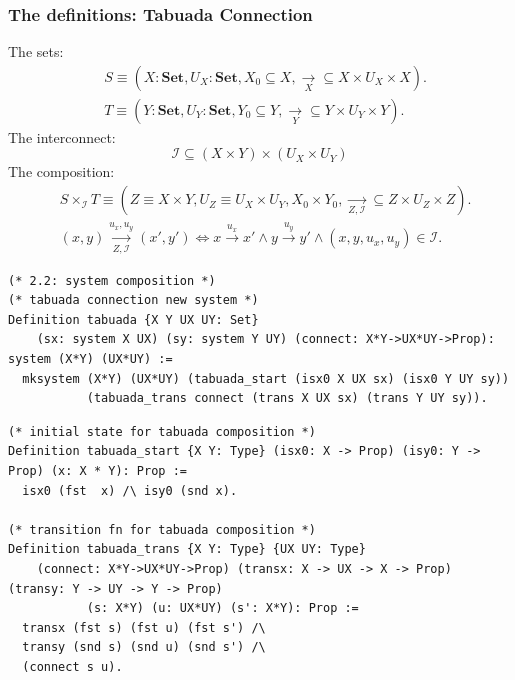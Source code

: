 \documentclass{beamer}
\begin{document}
\begin{frame}[fragile]
\frametitle{The definitions: Tabuada Connection}

{\tiny
The sets: 
\begin{align*}
    &S \equiv (X: \textbf{Set}, U_X: \textbf{Set}, X_0 \subseteq X, \underset{X}{\rightarrow} \subseteq X \times U_X \times X). \\
    &T \equiv (Y: \textbf{Set}, U_Y: \textbf{Set}, Y_0 \subseteq Y, \underset{Y}{\rightarrow} \subseteq Y \times U_Y \times Y).
\end{align*} }
\pause
{\tiny The interconnect: $$\mathcal I \subseteq (X \times Y) \times (U_X \times U_Y)$$ }
\pause
{\tiny
The composition: 
\begin{align*}
    &S \times_{\mathcal I} T \equiv 
     (Z \equiv X \times Y, U_Z \equiv U_X \times U_Y,  X_0 \times Y_0, \underset{Z, \mathcal{I}}{\rightarrow} \subseteq Z \times U_Z \times Z). \\
    &(x, y) \underset{Z, \mathcal I}{\xrightarrow{u_x,u_y}} (x', y') \iff 
      x \xrightarrow{u_x} x' \land 
      y \xrightarrow{u_y} y' \land (x, y, u_x, u_y) \in \mathcal I.
\end{align*}
}

\pause

{\tiny
\begin{verbatim}
(* 2.2: system composition *)
(* tabuada connection new system *)
Definition tabuada {X Y UX UY: Set} 
    (sx: system X UX) (sy: system Y UY) (connect: X*Y->UX*UY->Prop): system (X*Y) (UX*UY) :=
  mksystem (X*Y) (UX*UY) (tabuada_start (isx0 X UX sx) (isx0 Y UY sy))
           (tabuada_trans connect (trans X UX sx) (trans Y UY sy)).
\end{verbatim}
}


{\tiny
\begin{verbatim}
(* initial state for tabuada composition *)
Definition tabuada_start {X Y: Type} (isx0: X -> Prop) (isy0: Y -> Prop) (x: X * Y): Prop :=
  isx0 (fst  x) /\ isy0 (snd x).

(* transition fn for tabuada composition *)
Definition tabuada_trans {X Y: Type} {UX UY: Type}
    (connect: X*Y->UX*UY->Prop) (transx: X -> UX -> X -> Prop) (transy: Y -> UY -> Y -> Prop)
           (s: X*Y) (u: UX*UY) (s': X*Y): Prop :=
  transx (fst s) (fst u) (fst s') /\
  transy (snd s) (snd u) (snd s') /\
  (connect s u).
\end{verbatim}
}

\end{frame}
\end{document}
